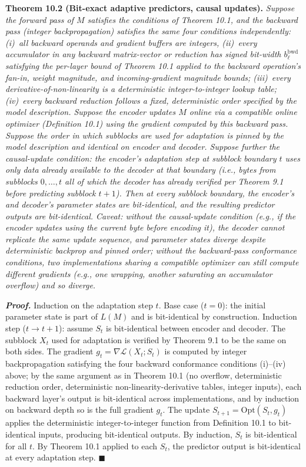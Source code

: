 \documentclass[
]{article}
\begin{document}
\textbf{Theorem 10.2 (Bit-exact adaptive predictors, causal updates).}
\emph{Suppose the forward pass of $M$ satisfies the conditions of
Theorem 10.1, and the \emph{backward pass} (integer backpropagation)
satisfies the same four conditions independently: (i)~all backward
operands and gradient buffers are integers, (ii)~every accumulator
in any backward matrix-vector or reduction has signed bit-width
$b^{\mathrm{bwd}}_\ell$ satisfying the per-layer bound of
Theorem 10.1 applied to the backward operation's fan-in, weight
magnitude, and incoming-gradient magnitude bounds; (iii)~every
derivative-of-non-linearity is a deterministic integer-to-integer
lookup table; (iv)~every backward reduction follows a fixed,
deterministic order specified by the model description. Suppose the
encoder updates $M$ online via a compatible online optimizer
(Definition 10.1) using the gradient computed by this backward
pass. Suppose the order in which subblocks are used for adaptation is
pinned by the model description and identical on encoder and
decoder. Suppose further the \emph{causal-update condition}: the
encoder's adaptation step at subblock boundary $t$ uses only data
already available to the decoder at that boundary (i.e., bytes from
subblocks $0, \ldots, t$ all of which the decoder has already
verified per Theorem 9.1 before predicting subblock $t+1$). Then at
every subblock boundary, the encoder's and decoder's parameter
states are bit-identical, and the resulting predictor outputs are
bit-identical. \emph{Caveat:} without the causal-update condition
(e.g., if the encoder updates using the current byte before encoding
it), the decoder cannot replicate the same update sequence, and
parameter states diverge despite deterministic backprop and pinned
order; without the backward-pass conformance conditions, two
implementations sharing a compatible optimizer can still compute
different gradients (e.g., one wrapping, another saturating an
accumulator overflow) and so diverge.}

\emph{\textbf{Proof.}} Induction on the adaptation step $t$. Base
case ($t = 0$): the initial parameter state is part of $L(M)$ and is
bit-identical by construction. Induction step ($t \to t+1$): assume
$S_t$ is bit-identical between encoder and decoder. The subblock
$X_t$ used for adaptation is verified by Theorem 9.1 to be the same
on both sides. The gradient $g_t = \nabla \mathcal{L}(X_t; S_t)$ is
computed by integer backpropagation satisfying the four backward
conformance conditions (i)--(iv) above; by the same argument as in
Theorem 10.1 (no overflow, deterministic reduction order,
deterministic non-linearity-derivative tables, integer inputs),
each backward layer's output is bit-identical across implementations,
and by induction on backward depth so is the full gradient
$g_t$. The update $S_{t+1} = \mathrm{Opt}(S_t, g_t)$ applies
the deterministic integer-to-integer function from Definition 10.1
to bit-identical inputs, producing bit-identical outputs. By
induction, $S_t$ is bit-identical for all $t$. By Theorem 10.1
applied to each $S_t$, the predictor output is bit-identical at every
adaptation step. \hfill$\blacksquare$
\end{document}
